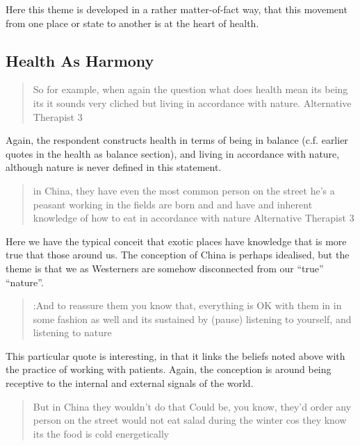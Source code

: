Here this theme is developed in a rather matter-of-fact way, that this movement from one place or state to another is at the heart of health. 

\subsection{Health As Harmony}
\label{sec:health-as-harmony}

\begin{quotation}
   So for example, when again the question what does health mean its being its it sounds very cliched but living in accordance with nature.
Alternative Therapist 3
\end{quotation}

Again, the respondent constructs health in terms of being in balance (c.f. earlier quotes in the health as balance section),  and living in accordance with nature, although nature is never defined in this statement. 

\begin{quotation}
   in China, they have even the most common person on the street he's a peasant working in the fields are born and and have and inherent knowledge of how to eat in accordance with nature 
Alternative Therapist 3
\end{quotation}

Here we have the typical conceit that exotic places have knowledge that is more true that those around us. The conception of China is perhaps idealised, but the theme is that we as Westerners are somehow disconnected from our ``true'' ``nature''. 

\begin{quotation}
  :And to reassure them you know that, everything is OK with them in in some fashion as well and its sustained by (pause) listening to yourself, and listening to nature

\end{quotation}

This particular quote is interesting, in that it links the beliefs noted above with the practice of working with patients. Again, the conception is around being receptive to the internal and external signals of the world. 

\begin{quotation}
  But in China they wouldn't do that Could be, you know, they'd order any person on the street would not eat salad during the winter cos they know its the food is cold energetically 

\end{quotation}

